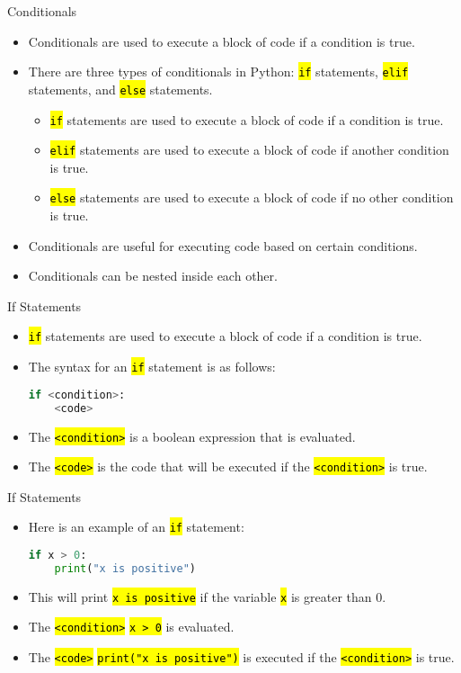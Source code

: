 \documentclass[
    aspectratio=169, 
    usepdftitle=false, 
    xcolor={dvipsnames},
    hyperref={
        colorlinks,
        linkcolor=black,
        urlcolor=blue}
    ]{beamer}
\let\OldTexttt\texttt
\renewcommand{\texttt}[1]{\OldTexttt{\hl{#1}}}%
\begin{document}
\begin{frame}{Conditionals}
    \begin{itemize}
        \item Conditionals are used to execute a block of code if a condition is true.
        \item There are three types of conditionals in Python: \texttt{if} statements, \texttt{elif} statements, and \texttt{else} statements.
        \begin{itemize}
            \item \texttt{if} statements are used to execute a block of code if a condition is true.
            \item \texttt{elif} statements are used to execute a block of code if another condition is true.
            \item \texttt{else} statements are used to execute a block of code if no other condition is true.
        \end{itemize}
        \item Conditionals are useful for executing code based on certain conditions.
        \item Conditionals can be nested inside each other.
    \end{itemize}
\end{frame}

\begin{frame}[fragile]{If Statements}
    \begin{itemize}
        \item \texttt{if} statements are used to execute a block of code if a condition is true.
        \item The syntax for an \texttt{if} statement is as follows:
        \begin{lstlisting}[language=Python]
if <condition>:
    <code>
        \end{lstlisting}
        \item The \texttt{<condition>} is a boolean expression that is evaluated.
        \item The \texttt{<code>} is the code that will be executed if the \texttt{<condition>} is true.
    \end{itemize}
\end{frame}

\begin{frame}[fragile]{If Statements}
    \begin{itemize}
        \item Here is an example of an \texttt{if} statement:
        \begin{lstlisting}[language=Python]
if x > 0:
    print("x is positive")
        \end{lstlisting}
        \item This will print \texttt{x is positive} if the variable \texttt{x} is greater than 0.
        \item The \texttt{<condition>} \texttt{x > 0} is evaluated.
        \item The \texttt{<code>} \texttt{print("x is positive")} is executed if the \texttt{<condition>} is true.
    \end{itemize}
\end{frame}
\end{document}
